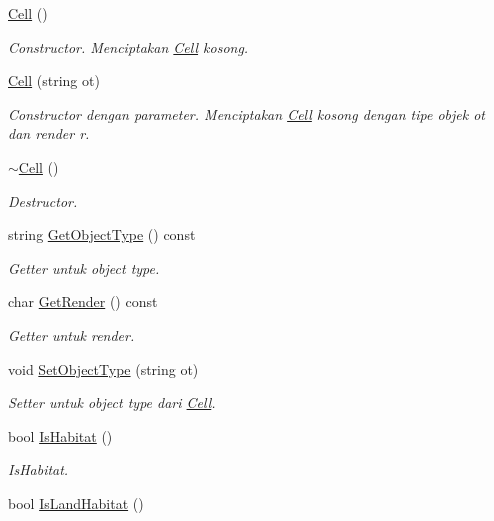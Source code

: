 \begin{DoxyCompactItemize}
\item 
\hyperlink{classCell_a394510643e8664cf12b5efaf5cb99f71}{Cell} ()
\begin{DoxyCompactList}\small\item\em Constructor. Menciptakan \hyperlink{classCell}{Cell} kosong. \end{DoxyCompactList}\item 
\hyperlink{classCell_a26ca23bd35b1be145b8c161ac36b9bda}{Cell} (string ot)
\begin{DoxyCompactList}\small\item\em Constructor dengan parameter. Menciptakan \hyperlink{classCell}{Cell} kosong dengan tipe objek ot dan render r. \end{DoxyCompactList}\item 
\hyperlink{classCell_a9fa559f7a28e2b4336c6879ca09304d8}{$\sim$\+Cell} ()
\begin{DoxyCompactList}\small\item\em Destructor. \end{DoxyCompactList}\item 
string \hyperlink{classCell_a6218f05e1d9dcdf9ed61c5196040b1bd}{Get\+Object\+Type} () const 
\begin{DoxyCompactList}\small\item\em Getter untuk object type. \end{DoxyCompactList}\item 
char \hyperlink{classCell_a81e6357d206db3a6e6299029dc2273e5}{Get\+Render} () const 
\begin{DoxyCompactList}\small\item\em Getter untuk render. \end{DoxyCompactList}\item 
void \hyperlink{classCell_ad814dd782c42728917888c893b99b9df}{Set\+Object\+Type} (string ot)
\begin{DoxyCompactList}\small\item\em Setter untuk object type dari \hyperlink{classCell}{Cell}. \end{DoxyCompactList}\item 
bool \hyperlink{classCell_ab44ecb9c8347d20216b335af4e7c3700}{Is\+Habitat} ()
\begin{DoxyCompactList}\small\item\em Is\+Habitat. \end{DoxyCompactList}\item 
bool \hyperlink{classCell_a87c65d914c0be7928836fe8c46b5408e}{Is\+Land\+Habitat} ()

\end{DoxyCompactItemize}
